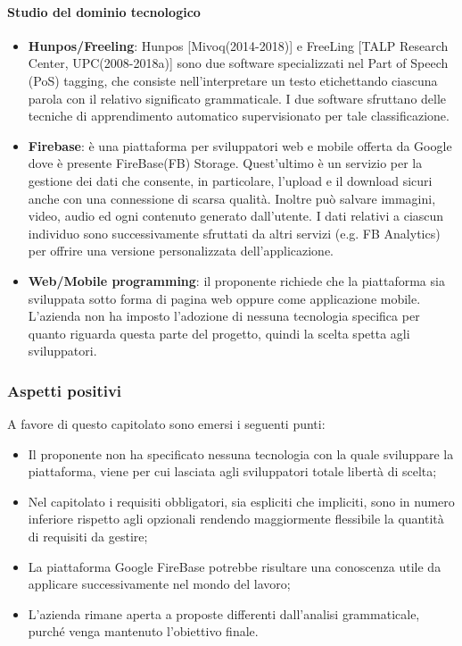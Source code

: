 \paragraph{Studio del dominio tecnologico}
\begin{itemize}
	\item \textbf{Hunpos/Freeling}: Hunpos [Mivoq(2014-2018)] e FreeLing [TALP
	Research Center, UPC(2008-2018a)] sono due software specializzati nel Part
	of Speech (PoS) tagging, che consiste nell'interpretare un testo
	etichettando ciascuna parola con il relativo significato grammaticale. I
	due software sfruttano delle tecniche di apprendimento automatico
	supervisionato per tale classificazione.  
	
	\item \textbf{Firebase}: è una piattaforma per sviluppatori web e mobile
	 offerta da Google dove è presente FireBase(FB) Storage. Quest'ultimo è un
	 servizio per la gestione dei dati che consente, in particolare, l'upload e
	 il download sicuri anche con una connessione di scarsa qualità. Inoltre 
	 può	 salvare	 immagini, video, audio ed ogni contenuto generato
	 dall'utente. I dati relativi a ciascun individuo sono successivamente
	 sfruttati da altri servizi (e.g. FB Analytics) per offrire una versione
	 personalizzata dell'applicazione.
	 
	\item \textbf{Web/Mobile programming}: il proponente richiede che la
	piattaforma sia sviluppata sotto forma di pagina web oppure come
	applicazione mobile. L'azienda non ha imposto l'adozione di nessuna
	tecnologia specifica per quanto riguarda questa parte del progetto, quindi
	la scelta spetta agli sviluppatori.		
\end{itemize}
\subsubsection{Aspetti positivi}
A favore di questo capitolato sono emersi i seguenti punti:
\begin{itemize}
	\item Il proponente non ha specificato nessuna tecnologia con la quale
	 sviluppare la piattaforma, viene per cui lasciata agli sviluppatori totale
	 libertà di scelta;
	\item Nel capitolato i requisiti obbligatori, sia espliciti che impliciti,
	 sono in numero inferiore rispetto agli opzionali rendendo maggiormente
	 flessibile la quantità di requisiti da gestire;
	\item La piattaforma Google FireBase potrebbe risultare una conoscenza
	 utile da applicare successivamente nel mondo del lavoro;
	\item L'azienda rimane aperta a proposte differenti dall'analisi
	 grammaticale, purché venga mantenuto l'obiettivo finale.
	
\end{itemize}

